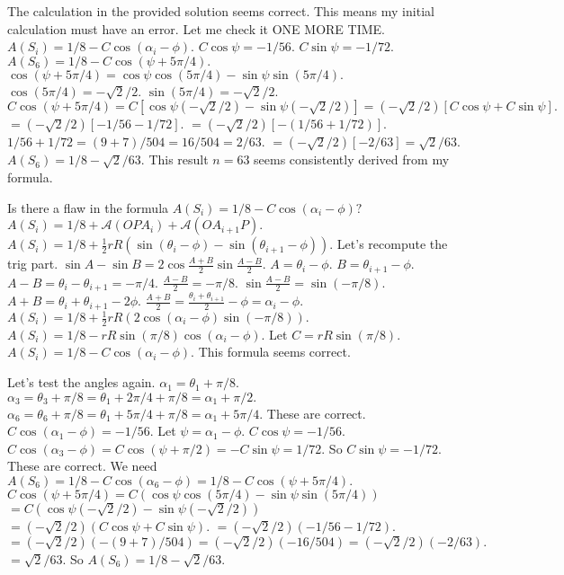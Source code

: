 The calculation in the provided solution seems correct. This means my initial calculation must have an error. Let me check it ONE MORE TIME. 
$A(S_i) = 1/8 - C \cos(\alpha_i - \phi).$ 
$C \cos \psi = -1/56.$ 
$C \sin \psi = -1/72.$ 
$A(S_6) = 1/8 - C \cos(\psi + 5\pi/4).$ 
$\cos(\psi + 5\pi/4) = \cos\psi \cos(5\pi/4) - \sin\psi \sin(5\pi/4).$ 
$\cos(5\pi/4) = -\sqrt{2}/2.$ $\sin(5\pi/4) = -\sqrt{2}/2.$ 
$C \cos(\psi + 5\pi/4) = C [ \cos\psi (-\sqrt{2}/2) - \sin\psi (-\sqrt{2}/2) ] = (-\sqrt{2}/2) [ C \cos\psi + C \sin\psi ].$ 
$= (-\sqrt{2}/2) [ -1/56 - 1/72 ].$ 
$= (-\sqrt{2}/2) [ -(1/56 + 1/72) ].$ 
$1/56 + 1/72 = (9+7)/504 = 16/504 = 2/63.$ 
$= (-\sqrt{2}/2) [-2/63] = \sqrt{2}/63.$ 
$A(S_6) = 1/8 - \sqrt{2}/63.$ 
This result $n=63$ seems consistently derived from my formula.

Is there a flaw in the formula $A(S_i) = 1/8 - C \cos(\alpha_i - \phi)?$ 
$A(S_i) = 1/8 + \mathcal{A}(OPA_i) + \mathcal{A}(OA_{i+1}P).$ 
$A(S_i) = 1/8 + \frac{1}{2} rR (\sin(\theta_i-\phi) - \sin(\theta_{i+1}-\phi)).$ 
Let's recompute the trig part. 
$\sin A - \sin B = 2 \cos \frac{A+B}{2} \sin \frac{A-B}{2}.$ 
$A = \theta_i - \phi.$ $B = \theta_{i+1} - \phi.$ 
$A-B = \theta_i - \theta_{i+1} = -\pi/4.$ $\frac{A-B}{2} = -\pi/8.$ 
$\sin \frac{A-B}{2} = \sin(-\pi/8).$ 
$A+B = \theta_i + \theta_{i+1} - 2\phi.$ $\frac{A+B}{2} = \frac{\theta_i+\theta_{i+1}}{2} - \phi = \alpha_i - \phi.$ 
$A(S_i) = 1/8 + \frac{1}{2} rR (2 \cos(\alpha_i - \phi) \sin(-\pi/8)).$ 
$A(S_i) = 1/8 - rR \sin(\pi/8) \cos(\alpha_i - \phi).$ 
Let $C = rR \sin(\pi/8).$ 
$A(S_i) = 1/8 - C \cos(\alpha_i - \phi).$ 
This formula seems correct.

Let's test the angles again. 
$\alpha_1 = \theta_1 + \pi/8.$ 
$\alpha_3 = \theta_3 + \pi/8 = \theta_1 + 2\pi/4 + \pi/8 = \alpha_1 + \pi/2.$ 
$\alpha_6 = \theta_6 + \pi/8 = \theta_1 + 5\pi/4 + \pi/8 = \alpha_1 + 5\pi/4.$ 
These are correct. 
$C \cos(\alpha_1 - \phi) = -1/56.$ Let $\psi = \alpha_1 - \phi.$ $C \cos \psi = -1/56.$ 
$C \cos(\alpha_3 - \phi) = C \cos(\psi+\pi/2) = - C \sin \psi = 1/72.$ So $C \sin \psi = -1/72.$ 
These are correct. 
We need $A(S_6) = 1/8 - C \cos(\alpha_6 - \phi) = 1/8 - C \cos(\psi+5\pi/4).$ 
$C \cos(\psi+5\pi/4) = C(\cos\psi \cos(5\pi/4) - \sin\psi \sin(5\pi/4))$ 
$= C(\cos\psi (-\sqrt{2}/2) - \sin\psi (-\sqrt{2}/2))$ 
$= (-\sqrt{2}/2) (C \cos\psi + C \sin\psi).$ 
$= (-\sqrt{2}/2) (-1/56 - 1/72).$ 
$= (-\sqrt{2}/2) (-(9+7)/504) = (-\sqrt{2}/2) (-16/504) = (-\sqrt{2}/2) (-2/63).$ 
$= \sqrt{2}/63.$ 
So $A(S_6) = 1/8 - \sqrt{2}/63.$

